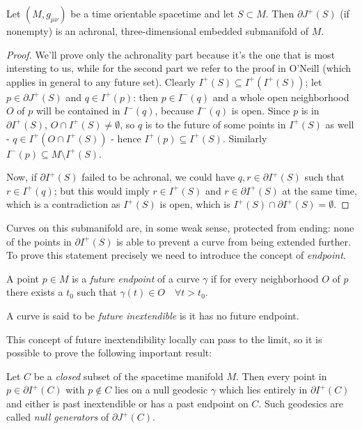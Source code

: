 \begin{theorem}
	Let \((M, g_{\mu\nu})\) be a time orientable spacetime and let \(S\subset M\). Then \(\partial J^+(S)\) (if nonempty) is an achronal, three-dimensional embedded submanifold of \(M\).
\end{theorem}
\begin{proof}
	We'll prove only the achronality part because it's the one that is most intersting to 
	us, while for the second part we refer to the proof in O'Neill \cite{o1983semi} (which applies in general 
	to any future set). Clearly \(I^+(S) \subseteq I^+(I^+(S))\); 
	let \(p\in \partial J^+(S)\) and \(q \in I^+(p)\): then \(p \in I^-(q)\) and a whole open neighborhood \(O\)  of \(p\) will be contained in \(I^-(q)\), 
	because \(I^-(q)\) is open. 
	Since \(p\) is in \(\partial I^+(S)\), \(O \cap I^+(S) \neq \emptyset\), so \(q\) is to the future of some points in \(I^+(S)\) as well - \(q \in I^+(O \cap I^+(S)) \) -
	 hence \(I^+(p) \subseteq I^+(S)\). 
	 Similarly \(I^-(p) \subseteq M \setminus I^+(S)\).
	
	Now, if \(\partial I^+(S)\) failed to be achronal, we could have 
	\(q,r \in \partial I^+(S)\) such that \(r \in I^+(q)\); but this would imply 
	\(r \in I^+(S)\) and \(r \in \partial I^+(S)\) at the same time, which is a 
	contradiction as \(I^+(S)\) is open, which is 
	\(I^+(S) \cap \partial I^+(S) = \emptyset\).
\end{proof}

Curves on this submanifold are, in some weak sense, protected from ending: none of the points in \(\partial I^+(S)\) is able to prevent a curve from being extended further. To prove this statement precisely we need to introduce the concept of \emph{endpoint}.
	\begin{definition}
		A point \(p\in M\) is a \emph{future endpoint} of a curve \(\gamma\) if for every neighborhood \(O\) of \(p\) there exists a \(t_0\) such that \(\gamma(t) \in O \quad \forall t >t_0\). 
		
		A curve is said to be \emph{future inextendible} is it has no future endpoint.
	\end{definition}

	This concept of future inextendibility locally can pass to the limit, 
	so it is possible to prove the following important result:
\begin{theorem}
	\label{th:null-generator}
	Let \(C\) be a \emph{closed} subset of the spacetime manifold \(M\). 
	Then every point in \(p\in \partial I^+(C)\) with \(p \notin C\) lies on a null 
	geodesic \(\gamma\) which lies entirely in \(\partial I^+(C)\) and either is 
	past inextendible or has a past endpoint on \(C\). Such geodesics are called \emph{null generators} of \(\partial J^+(C)\).
\end{theorem}

